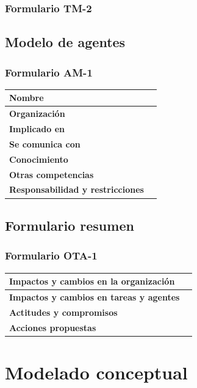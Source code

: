 \documentclass[a4paper,11pt]{article}
\begin{document}
			\subsubsection{Formulario TM-2}
		\subsection{Modelo de agentes}
			\subsubsection{Formulario AM-1}
			\begin{center}
				\begin{tabular}{| l | l |}
					\hline
					\textbf{Nombre} & \\
					\hline
					\textbf{Organización} & \\
					\hline
					\textbf{Implicado en} & \\
					\hline
					\textbf{Se comunica con} & \\
					\hline
					\textbf{Conocimiento} & \\
					\hline
					\textbf{Otras competencias} & \\
					\hline
					\textbf{Responsabilidad y restricciones} & \\
					\hline
				\end{tabular}
			\end{center}
		\subsection{Formulario resumen}
			\subsubsection{Formulario OTA-1}
			\begin{center}
				\begin{tabular}{| l | l |}
					\hline
					\textbf{Impactos y cambios en la organización} & \\
					\hline
					\textbf{Impactos y cambios en tareas y agentes} & \\
					\hline
					\textbf{Actitudes y compromisos} & \\
					\hline
					\textbf{Acciones propuestas} & \\
					\hline
				\end{tabular}
			\end{center}
	\section{Modelado conceptual}
\end{document}
